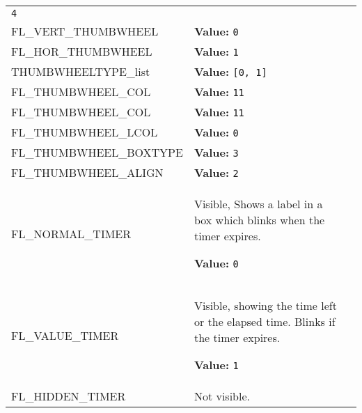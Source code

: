 \begin{longtable}{|p{\varnamewidth}|p{\vardescrwidth}|l}
{\tt 4}&\\
\cline{1-2}
\raggedright F\-L\-\_\-V\-E\-R\-T\-\_\-T\-H\-U\-M\-B\-W\-H\-E\-E\-L\- & \raggedright \textbf{Value:} 
{\tt 0}&\\
\cline{1-2}
\raggedright F\-L\-\_\-H\-O\-R\-\_\-T\-H\-U\-M\-B\-W\-H\-E\-E\-L\- & \raggedright \textbf{Value:} 
{\tt 1}&\\
\cline{1-2}
\raggedright T\-H\-U\-M\-B\-W\-H\-E\-E\-L\-T\-Y\-P\-E\-\_\-l\-i\-s\-t\- & \raggedright \textbf{Value:} 
{\tt \texttt{[}0\texttt{, }1\texttt{]}}&\\
\cline{1-2}
\raggedright F\-L\-\_\-T\-H\-U\-M\-B\-W\-H\-E\-E\-L\-\_\-C\-O\-L\-1\- & \raggedright \textbf{Value:} 
{\tt 11}&\\
\cline{1-2}
\raggedright F\-L\-\_\-T\-H\-U\-M\-B\-W\-H\-E\-E\-L\-\_\-C\-O\-L\-2\- & \raggedright \textbf{Value:} 
{\tt 11}&\\
\cline{1-2}
\raggedright F\-L\-\_\-T\-H\-U\-M\-B\-W\-H\-E\-E\-L\-\_\-L\-C\-O\-L\- & \raggedright \textbf{Value:} 
{\tt 0}&\\
\cline{1-2}
\raggedright F\-L\-\_\-T\-H\-U\-M\-B\-W\-H\-E\-E\-L\-\_\-B\-O\-X\-T\-Y\-P\-E\- & \raggedright \textbf{Value:} 
{\tt 3}&\\
\cline{1-2}
\raggedright F\-L\-\_\-T\-H\-U\-M\-B\-W\-H\-E\-E\-L\-\_\-A\-L\-I\-G\-N\- & \raggedright \textbf{Value:} 
{\tt 2}&\\
\cline{1-2}
\raggedright F\-L\-\_\-N\-O\-R\-M\-A\-L\-\_\-T\-I\-M\-E\-R\- & \raggedright Visible, Shows a label in a box which blinks when the timer 
          expires.

\textbf{Value:} 
{\tt 0}&\\
\cline{1-2}
\raggedright F\-L\-\_\-V\-A\-L\-U\-E\-\_\-T\-I\-M\-E\-R\- & \raggedright Visible, showing the time left or the elapsed time. Blinks if the
          timer expires.

\textbf{Value:} 
{\tt 1}&\\
\cline{1-2}
\raggedright F\-L\-\_\-H\-I\-D\-D\-E\-N\-\_\-T\-I\-M\-E\-R\- & \raggedright Not visible.


\end{longtable}
